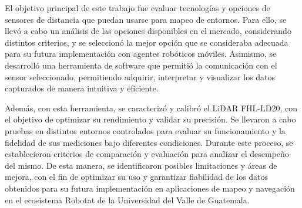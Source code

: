 El objetivo principal de este trabajo fue evaluar tecnologías y opciones de sensores de distancia que puedan usarse para mapeo de entornos. Para ello, se llevó a cabo un análisis de las opciones disponibles en el mercado, considerando distintos criterios, y se seleccionó la mejor opción que se consideraba adecuada para su futura implementación con agentes robóticos móviles. Asimismo, se desarrolló una herramienta de software que permitió la comunicación con el sensor seleccionado, permitiendo adquirir, interpretar y visualizar los datos capturados de manera intuitiva y eficiente. 

Además, con esta herramienta, se caracterizó y calibró el LiDAR FHL-LD20, con el objetivo de optimizar su rendimiento y validar su precisión. Se llevaron a cabo pruebas en distintos entornos controlados para evaluar su funcionamiento y la fidelidad de sus mediciones bajo diferentes condiciones. Durante este proceso, se establecieron criterios de comparación y evaluación para analizar el desempeño del mismo. De esta manera, se identificaron posibles limitaciones y áreas de mejora, con el fin de optimizar su uso y garantizar fiabilidad de los datos obtenidos para su futura implementación en aplicaciones de mapeo y navegación en el ecosistema Robotat de la Universidad del Valle de Guatemala.
